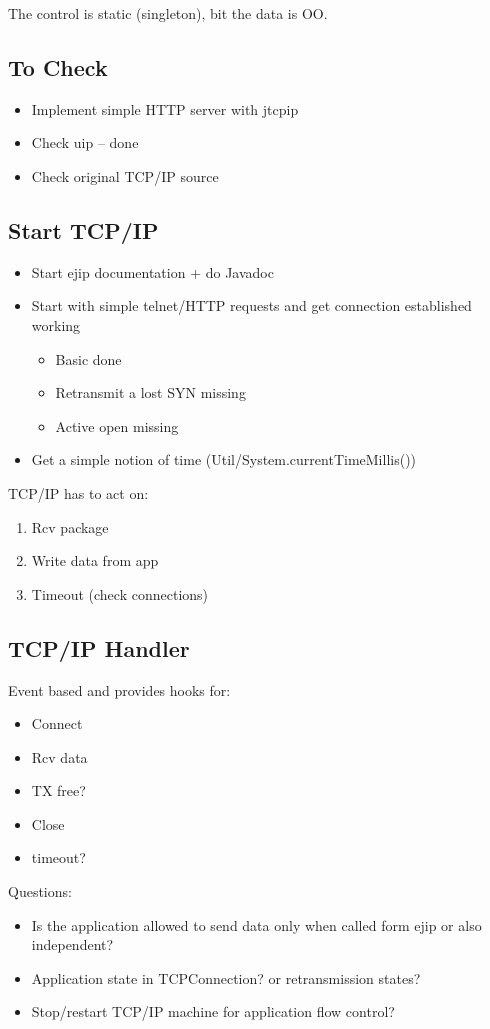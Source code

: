 The control is static (singleton), bit the data is OO.

\subsection{To Check}

\begin{itemize}
    \item Implement simple HTTP server with jtcpip
    \item Check uip -- done
    \item Check original TCP/IP source
\end{itemize}

\subsection{Start TCP/IP}

\begin{itemize}
    \item Start ejip documentation + do Javadoc
    \item Start with simple telnet/HTTP requests and get connection
    established working
    \begin{itemize}
        \item Basic done
        \item Retransmit a lost SYN missing
        \item Active open missing
    \end{itemize}
    \item Get a simple notion of time
    (Util/System.currentTimeMillis())
\end{itemize}

TCP/IP has to act on:
\begin{enumerate}
    \item Rcv package
    \item Write data from app
    \item Timeout (check connections)
\end{enumerate}

\subsection{TCP/IP Handler}

Event based and provides hooks for:
\begin{itemize}
    \item Connect
    \item Rcv data
    \item TX free?
    \item Close
    \item timeout?
\end{itemize}

Questions:
\begin{itemize}
    \item Is the application allowed to send data only when called
    form ejip or also independent?
    \item Application state in TCPConnection? or retransmission
    states?
    \item Stop/restart TCP/IP machine for application flow control?
\end{itemize}
